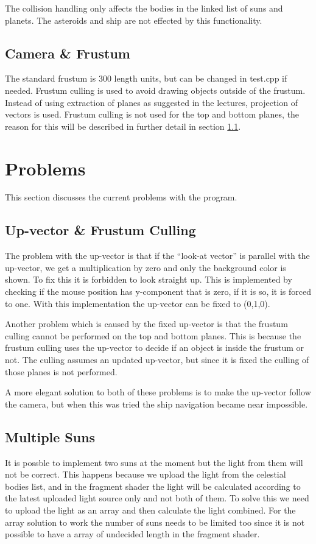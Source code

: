 \documentclass[a4paper,12pt]{article}
\begin{document}
The collision handling only affects the bodies in the linked list of suns and
planets. The asteroids and ship are not effected by this functionality.

\subsection{Camera \& Frustum}
The standard frustum is 300 length units, but can be changed in test.cpp if
needed. Frustum culling is used to avoid drawing objects outside of the
frustum. Instead of using extraction of planes as suggested in the lectures,
projection of vectors is used. Frustum culling is not used for the top and
bottom planes, the reason for this will be described in further detail in
section \ref{sec:up_prob}.


\section{Problems}
This section discusses the current problems with the program.
\subsection{Up-vector \& Frustum Culling}
\label{sec:up_prob}
The problem with the up-vector is that if the ``look-at vector'' is parallel
with the up-vector, we get a multiplication by zero and  only the background
color is shown. To fix this it is forbidden to look straight up. This is
implemented by checking if the mouse position has y-component that is zero, if
it is so, it is forced to one. With this implementation the up-vector can be
fixed to (0,1,0). 


Another problem which is caused by the fixed up-vector is that the
frustum culling cannot be performed on the top and bottom planes. This is
because the frustum culling uses the up-vector to decide if an object is inside
the frustum or not. The culling assumes an updated up-vector, but since it is
fixed the culling of those planes is not performed.


A more elegant solution to both of these problems is to make the up-vector
follow the camera, but when this was tried the ship navigation became near
impossible.
\subsection{Multiple Suns}
It is possble to implement two suns at the moment but the light from them will
not be correct. This happens because we upload the light from the celestial
bodies list, and in the fragment shader the light will be calculated according
to the latest uploaded light source only and not both of them. To solve this we
need to upload the light as an array and then calculate the light combined. For
the array solution to work the number of suns needs to be limited too since it
is not possible to have a array of undecided length in the fragment shader.
\end{document}
